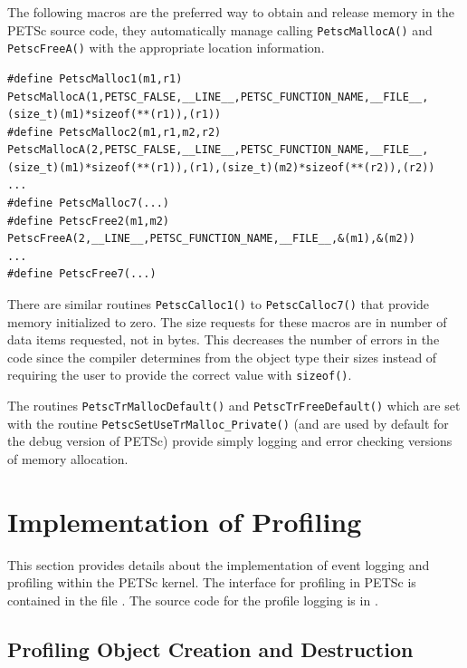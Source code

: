 The following macros are the preferred way to obtain and release memory in the PETSc source code, they automatically manage calling \lstinline{PetscMallocA()} and \lstinline{PetscFreeA()} with the appropriate location information.
\begin{lstlisting}
#define PetscMalloc1(m1,r1) PetscMallocA(1,PETSC_FALSE,__LINE__,PETSC_FUNCTION_NAME,__FILE__, (size_t)(m1)*sizeof(**(r1)),(r1))
#define PetscMalloc2(m1,r1,m2,r2) PetscMallocA(2,PETSC_FALSE,__LINE__,PETSC_FUNCTION_NAME,__FILE__, (size_t)(m1)*sizeof(**(r1)),(r1),(size_t)(m2)*sizeof(**(r2)),(r2))
...
#define PetscMalloc7(...)
#define PetscFree2(m1,m2)   PetscFreeA(2,__LINE__,PETSC_FUNCTION_NAME,__FILE__,&(m1),&(m2))
...
#define PetscFree7(...)
\end{lstlisting}
There are similar routines \lstinline{PetscCalloc1()}
to \lstinline{PetscCalloc7()} that provide memory initialized to
zero. The size requests for these macros are in number of data items
requested, not in bytes. This decreases the number of errors in the
code since the compiler determines from the object type their sizes
instead of requiring the user to provide the correct value with \lstinline{sizeof()}.

The routines \lstinline{PetscTrMallocDefault()} and \lstinline{PetscTrFreeDefault()} which are set with the routine \lstinline{PetscSetUseTrMalloc_Private()} (and are used by default for the debug version of PETSc) provide simply logging and error checking versions of memory allocation.



\section{Implementation of Profiling}
\label{sec:profimpl}

This section provides details about the implementation of event
logging and profiling within the PETSc kernel.
The interface for profiling in PETSc is contained in the file
\href{http://www.mcs.anl.gov/petsc/petsc-master/include/petsclog.h.html}{}. The source code for the profile logging
is in .

\subsection{Profiling Object Creation and Destruction}

